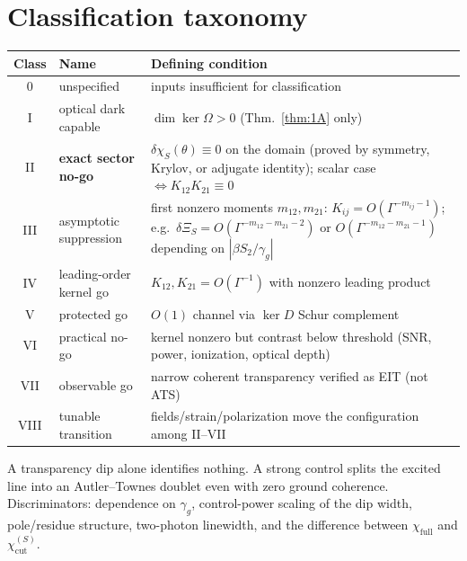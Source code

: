 \documentclass[11pt,a4paper]{article}
\theoremstyle{remark}
\newcommand{\dchi}{\delta\chi_{S}}
\newcommand{\chifull}{\chi_{\mathrm{full}}}
\newcommand{\chicut}{\chi^{(S)}_{\mathrm{cut}}}
\begin{document}
\section{Classification taxonomy}

\begin{center}
\renewcommand{\arraystretch}{1.25}
\begin{tabular}{clp{8.6cm}}
\toprule
Class & Name & Defining condition\\
\midrule
0 & unspecified & inputs insufficient for classification\\
I & optical dark capable & $\dim\ker\Omega>0$ (Thm.~\ref{thm:1A} only)\\
II & \textbf{exact sector no-go} & $\dchi(\theta)\equiv0$ on the domain
     (proved by symmetry, Krylov, or adjugate identity);
     scalar case $\Leftrightarrow K_{12}K_{21}\equiv0$\\
III & asymptotic suppression & first nonzero moments $m_{12},m_{21}$:
     $K_{ij}=O(\Gamma^{-m_{ij}-1})$; e.g.\
     $\delta\Xi_S=O(\Gamma^{-m_{12}-m_{21}-2})$ or $O(\Gamma^{-m_{12}-m_{21}-1})$
     depending on $|\beta S_2/\gamma_g|$\\
IV & leading-order kernel go & $K_{12},K_{21}=O(\Gamma^{-1})$ with nonzero
     leading product\\
V & protected go & $O(1)$ channel via $\ker D$ Schur complement\\
VI & practical no-go & kernel nonzero but contrast below threshold
     (SNR, power, ionization, optical depth)\\
VII & observable go & narrow coherent transparency verified as EIT
     (not ATS)\\
VIII & tunable transition & fields/strain/polarization move the
     configuration among II--VII\\
\bottomrule
\end{tabular}
\end{center}

\begin{warningbox}
A transparency dip alone identifies nothing. A strong control splits the
excited line into an Autler--Townes doublet even with zero ground coherence.
Discriminators: dependence on $\gamma_g$, control-power scaling of the dip
width, pole/residue structure, two-photon linewidth, and the difference
between $\chifull$ and $\chicut$.
\end{warningbox}
\end{document}
